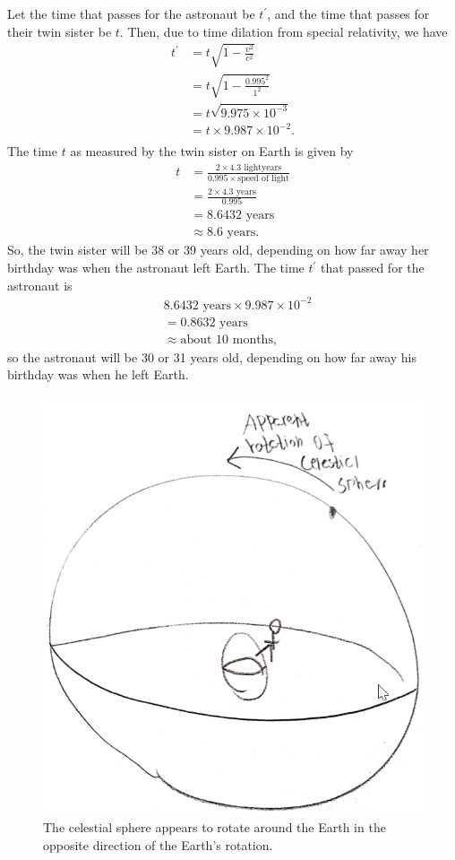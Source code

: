 \documentclass{templates/homework}
\begin{document}
\exercisepart
Let the time that passes for the astronaut be $t^\prime$, and the
time that passes for their twin sister be $t$. Then, due to time dilation from special
relativity, we have
\begin{align*}
    t^\prime &= t\sqrt{1 - \frac{v^2}{c^2}} \\
    &= t\sqrt{1 - \frac{0.995^2}{1^2}} \\
    &= t\sqrt{9.975 \times 10^{-3}} \\
    &= t \times 9.987 \times 10^{-2}. \\
\end{align*}
The time $t$ as measured by the twin sister on Earth is
given by
\begin{align*}
    t &= \frac{2 \times 4.3 \text{ lightyears}}{0.995 \times \text{speed of light}} \\
    &= \frac{2 \times 4.3 \text{ years}}{0.995} \\
    &= 8.6432 \text{ years} \\
    &\approx \text{8.6 years}.
\end{align*}
So, the twin sister will be 38 or 39 years old, depending on how far
away her birthday was when the astronaut left Earth. The time $t^\prime$ that passed
for the astronaut is 
\begin{align*}
    &8.6432 \text{ years} \times 9.987 \times 10^{-2} \\
    &= 0.8632 \text{ years} \\
    &\approx \text{about 10 months},
\end{align*}
so the astronaut will be 30 or 31 years old, depending on how far away his birthday was
when he left Earth.
\exercise
\exercisepart
\begin{figure}[t]
    \includegraphics[]{diagrams/figure1.png}
    \caption{The celestial sphere appears to rotate
    around the Earth in the opposite direction of the
    Earth's rotation.}
    \label{fig:1}
\end{figure}
\end{document}
